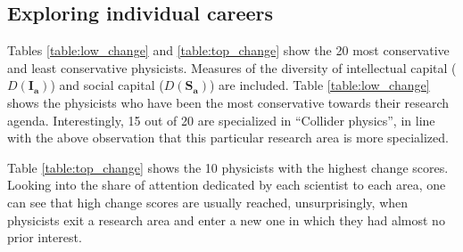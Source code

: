 \documentclass{article}
\begin{document}

\subsection{\label{appendix:cases}Exploring individual careers}

 Tables \ref{table:low_change} and \ref{table:top_change} show the 20 most conservative and least conservative physicists. Measures of the diversity of intellectual capital ($D(\bm{I_a})$) and social capital ($D(\bm{S_a})$) are included. Table \ref{table:low_change} shows the physicists who have been the most conservative towards their research agenda. Interestingly, 15 out of 20 are specialized in ``Collider physics'', in line with the above observation that this particular research area is more specialized.

Table \ref{table:top_change} shows the 10 physicists with the highest change scores.  Looking into the share of attention dedicated by each scientist to each area, one can see that high change scores are usually reached, unsurprisingly, when physicists exit a research area and enter a new one in which they had almost no prior interest. 
\end{document}
